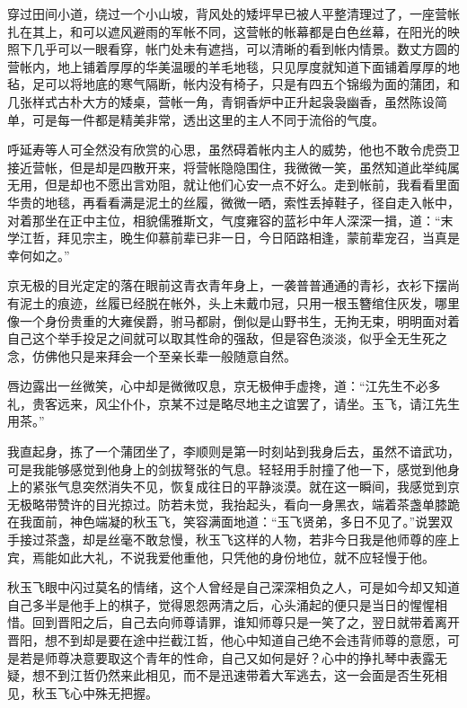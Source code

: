 穿过田间小道，绕过一个小山坡，背风处的矮坪早已被人平整清理过了，一座营帐扎在其上，和可以遮风避雨的军帐不同，这营帐的帐幕都是白色丝幕，在阳光的映照下几乎可以一眼看穿，帐门处未有遮挡，可以清晰的看到帐内情景。数丈方圆的营帐内，地上铺着厚厚的华美温暖的羊毛地毯，只见厚度就知道下面铺着厚厚的地毡，足可以将地底的寒气隔断，帐内没有椅子，只是有四五个锦缎为面的蒲团，和几张样式古朴大方的矮桌，营帐一角，青铜香炉中正升起袅袅幽香，虽然陈设简单，可是每一件都是精美非常，透出这里的主人不同于流俗的气度。

呼延寿等人可全然没有欣赏的心思，虽然碍着帐内主人的威势，他也不敢令虎赍卫接近营帐，但是却是四散开来，将营帐隐隐围住，我微微一笑，虽然知道此举纯属无用，但是却也不愿出言劝阻，就让他们心安一点不好么。走到帐前，我看看里面华贵的地毯，再看看满是泥土的丝履，微微一晒，索性丢掉鞋子，径自走入帐中，对着那坐在正中主位，相貌儒雅斯文，气度雍容的蓝衫中年人深深一揖，道：“末学江哲，拜见宗主，晚生仰慕前辈已非一日，今日陌路相逢，蒙前辈宠召，当真是幸何如之。”

京无极的目光定定的落在眼前这青衣青年身上，一袭普普通通的青衫，衣衫下摆尚有泥土的痕迹，丝履已经脱在帐外，头上未戴巾冠，只用一根玉簪绾住灰发，哪里像一个身份贵重的大雍侯爵，驸马都尉，倒似是山野书生，无拘无束，明明面对着自己这个举手投足之间就可以取其性命的强敌，但是容色淡淡，似乎全无生死之念，仿佛他只是来拜会一个至亲长辈一般随意自然。

唇边露出一丝微笑，心中却是微微叹息，京无极伸手虚搀，道：“江先生不必多礼，贵客远来，风尘仆仆，京某不过是略尽地主之谊罢了，请坐。玉飞，请江先生用茶。”

我直起身，拣了一个蒲团坐了，李顺则是第一时刻站到我身后去，虽然不谙武功，可是我能够感觉到他身上的剑拔弩张的气息。轻轻用手肘撞了他一下，感觉到他身上的紧张气息突然消失不见，恢复成往日的平静淡漠。就在这一瞬间，我感觉到京无极略带赞许的目光掠过。防若未觉，我抬起头，看向一身黑衣，端着茶盏单膝跪在我面前，神色端凝的秋玉飞，笑容满面地道：“玉飞贤弟，多日不见了。”说罢双手接过茶盏，却是丝毫不敢怠慢，秋玉飞这样的人物，若非今日我是他师尊的座上宾，焉能如此大礼，不说我爱他重他，只凭他的身份地位，就不应轻慢于他。

秋玉飞眼中闪过莫名的情绪，这个人曾经是自己深深相负之人，可是如今却又知道自己多半是他手上的棋子，觉得恩怨两清之后，心头涌起的便只是当日的惺惺相惜。回到晋阳之后，自己去向师尊请罪，谁知师尊只是一笑了之，翌日就带着离开晋阳，想不到却是要在途中拦截江哲，他心中知道自己绝不会违背师尊的意愿，可是若是师尊决意要取这个青年的性命，自己又如何是好？心中的挣扎琴中表露无疑，想不到江哲仍然来此相见，而不是迅速带着大军逃去，这一会面是否生死相见，秋玉飞心中殊无把握。

